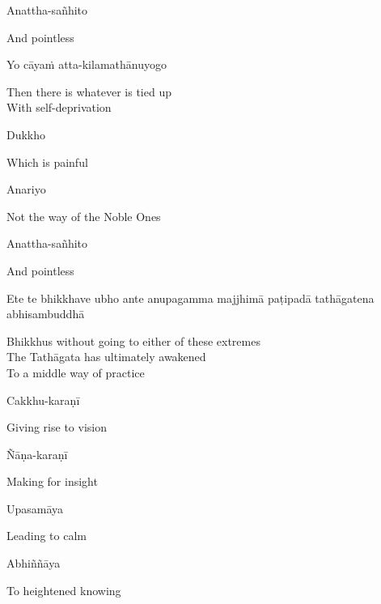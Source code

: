 Anattha-sañhito

\begin{cprenglish}
  And pointless
\end{cprenglish}

Yo cāyaṁ atta-kilamathānuyogo

\begin{cprenglish}
  Then there is whatever is tied up\\
  With self-deprivation
\end{cprenglish}

Dukkho

\begin{cprenglish}
  Which is painful
\end{cprenglish}

Anariyo

\begin{cprenglish}
  Not the way of the Noble Ones
\end{cprenglish}

Anattha-sañhito

\begin{cprenglish}
  And pointless
\end{cprenglish}

Ete te bhikkhave ubho ante anupagamma majjhimā paṭipadā tathāgatena abhisambuddhā

\begin{cprenglish}
  Bhikkhus without going to either of these extremes\\
  The Tathāgata has ultimately awakened\\
  To a middle way of practice
\end{cprenglish}

Cakkhu-karaṇī

\begin{cprenglish}
  Giving rise to vision
\end{cprenglish}

Ñāṇa-karaṇī

\begin{cprenglish}
  Making for insight
\end{cprenglish}

Upasamāya

\begin{cprenglish}
  Leading to calm
\end{cprenglish}

Abhiññāya

\begin{cprenglish}
  To heightened knowing
\end{cprenglish}

